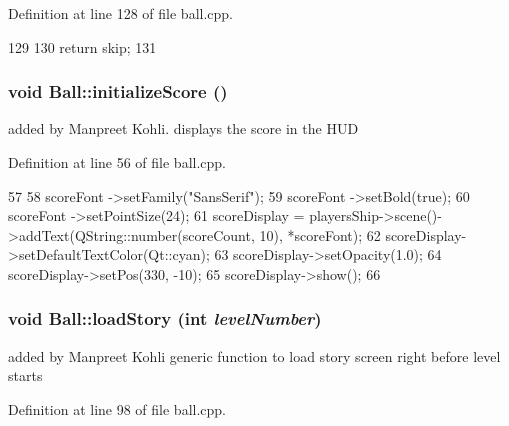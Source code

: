 Definition at line 128 of file ball.cpp.


\begin{DoxyCode}
129 {
130     return skip;
131 }
\end{DoxyCode}
\hypertarget{class_ball_a269f58ffac3a2ec3ad18be40df079816}{
\subsubsection[{initializeScore}]{\setlength{\rightskip}{0pt plus 5cm}void Ball::initializeScore ()}}
\label{class_ball_a269f58ffac3a2ec3ad18be40df079816}
added by Manpreet Kohli. displays the score in the HUD 

Definition at line 56 of file ball.cpp.


\begin{DoxyCode}
57 {
58     scoreFont ->setFamily("SansSerif");
59     scoreFont ->setBold(true);
60     scoreFont ->setPointSize(24);
61     scoreDisplay = playersShip->scene()->addText(QString::number(scoreCount, 10),
       *scoreFont);
62     scoreDisplay->setDefaultTextColor(Qt::cyan);
63     scoreDisplay->setOpacity(1.0);
64     scoreDisplay->setPos(330, -10);
65     scoreDisplay->show();
66 }
\end{DoxyCode}
\hypertarget{class_ball_a83e89d3d0787c7bb339014be48f6ff03}{
\subsubsection[{loadStory}]{\setlength{\rightskip}{0pt plus 5cm}void Ball::loadStory (int {\em levelNumber})}}
\label{class_ball_a83e89d3d0787c7bb339014be48f6ff03}
added by Manpreet Kohli generic function to load story screen right before level starts 

Definition at line 98 of file ball.cpp.


